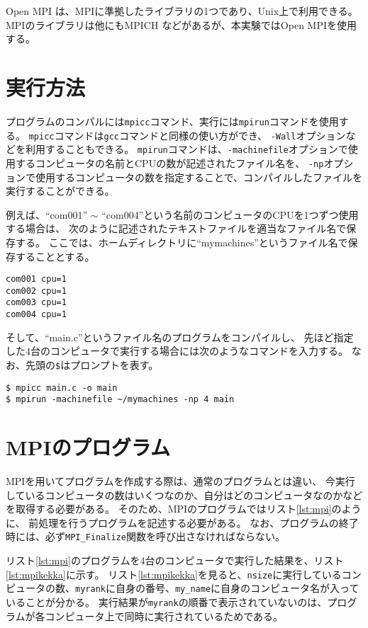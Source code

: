 \documentclass[a4j,titlepage]{jsarticle}
\begin{document}
Open MPI \cite{bib:1} は、MPIに準拠したライブラリの1つであり、Unix上で利用できる。
MPIのライブラリは他にもMPICH \cite{bib:2} などがあるが、本実験ではOpen MPIを使用する。


\section{実行方法}
プログラムのコンパルには\texttt{mpicc}コマンド、実行には\texttt{mpirun}コマンドを使用する。
\texttt{mpicc}コマンドは\texttt{gcc}コマンドと同様の使い方ができ、
\texttt{-Wall}オプションなどを利用することもできる。
\texttt{mpirun}コマンドは、\texttt{-machinefile}オプションで使用するコンピュータの名前とCPUの数が記述されたファイル名を、
\texttt{-np}オプションで使用するコンピュータの数を指定することで、コンパイルしたファイルを実行することができる。

例えば、``com001'' $\sim$ ``com004''という名前のコンピュータのCPUを1つずつ使用する場合は、
次のように記述されたテキストファイルを適当なファイル名で保存する。
ここでは、ホームディレクトリに``mymachines''というファイル名で保存することとする。

\begin{lstlisting}[style=text]
com001 cpu=1
com002 cpu=1
com003 cpu=1
com004 cpu=1
\end{lstlisting}

そして、``main.c''というファイル名のプログラムをコンパイルし、
先ほど指定した$4$台のコンピュータで実行する場合には次のようなコマンドを入力する。
なお、先頭の\texttt{\$}はプロンプトを表す。

\begin{lstlisting}[style=text]
$ mpicc main.c -o main
$ mpirun -machinefile ~/mymachines -np 4 main
\end{lstlisting}


\section{MPIのプログラム}
MPIを用いてプログラムを作成する際は、通常のプログラムとは違い、
今実行しているコンピュータの数はいくつなのか、自分はどのコンピュータなのかなどを取得する必要がある。
そのため、MPIのプログラムではリスト\ref{lst:mpi}のように、
前処理を行うプログラムを記述する必要がある。
なお、プログラムの終了時には、必ず\texttt{MPI\_Finalize}関数を呼び出さなければならない。



リスト\ref{lst:mpi}のプログラムを4台のコンピュータで実行した結果を、リスト\ref{lst:mpikekka}に示す。
リスト\ref{lst:mpikekka}を見ると、\texttt{nsize}に実行しているコンピュータの数、\texttt{myrank}に自身の番号、\texttt{my\_name}に自身のコンピュータ名が入っていることが分かる。
実行結果が\texttt{myrank}の順番で表示されていないのは、プログラムが各コンピュータ上で同時に実行されているためである。
\end{document}
